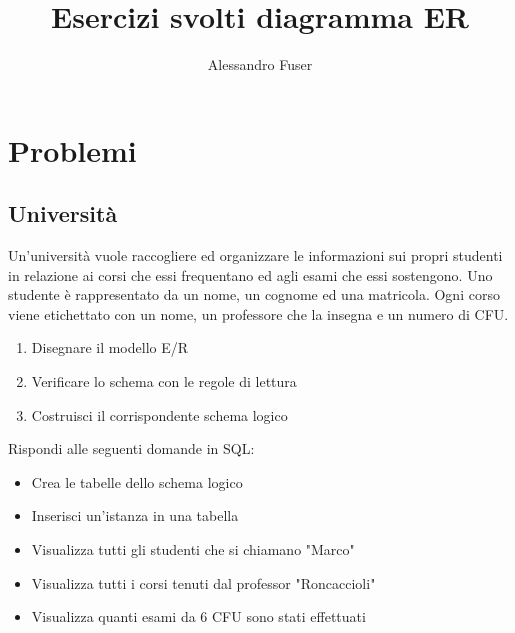\documentclass{article}
\begin{document}
	
	\title{Esercizi svolti diagramma ER}
	\author{Alessandro Fuser}
	\maketitle
	
	\pagebreak
	
	\tableofcontents
	
	\pagebreak
	
	\section{Problemi}
	\subsection{Università}
	Un'università vuole raccogliere ed organizzare le informazioni sui propri studenti in relazione ai corsi che essi frequentano ed agli esami che essi sostengono. Uno studente è rappresentato da un nome, un cognome ed una matricola. Ogni corso viene etichettato con un nome, un professore che la insegna e un numero di CFU.
	\begin{enumerate}
		\item Disegnare il modello E/R
		\item Verificare lo schema con le regole di lettura
		\item Costruisci il corrispondente schema logico
	\end{enumerate}
	Rispondi alle seguenti domande in SQL:
	\begin{itemize}
		\item Crea le tabelle dello schema logico
		\item Inserisci un'istanza in una tabella
		\item Visualizza tutti gli studenti che si chiamano "Marco"
		\item Visualizza tutti i corsi tenuti dal professor "Roncaccioli"
		\item Visualizza quanti esami da 6 CFU sono stati effettuati
	\end{itemize}
	
\end{document}
